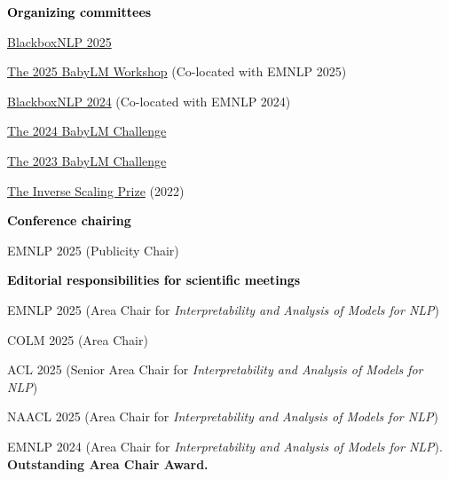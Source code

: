 \documentclass[10pt]{article}
\renewcommand{\subsection}[1]{\textcolor{black}{#1}}
\newcommand{\halfblankline}{\quad\vspace{-0.5\baselineskip}\pagebreak[3]}
\providecommand*\titlelink[2]{\href{#1}{\textcolor{accent}{#2}}}
\begin{document}
	\subsection{\textbf{Organizing committees}}
	\begin{innerlist}[itemsep=0pt]
	\item \titlelink{https://blackboxnlp.github.io}{BlackboxNLP 2025}
	\item \titlelink{https://babylm.github.io}{The 2025 BabyLM Workshop} (Co-located with EMNLP 2025)
	\item \titlelink{https://blackboxnlp.github.io}{BlackboxNLP 2024} (Co-located with EMNLP 2024)
	\item \titlelink{https://babylm.github.io}{The 2024 BabyLM Challenge}
	\item \titlelink{https://babylm.github.io/archive_2023.html}{The 2023 BabyLM Challenge}
	\item \titlelink{https://github.com/inverse-scaling/prize}{The Inverse Scaling Prize} (2022)
	\end{innerlist}

	\halfblankline

	\subsection{\textbf{Conference chairing}}
	\begin{innerlist}[itemsep=0pt]
	\item EMNLP 2025 (Publicity Chair)
	\end{innerlist}

	\halfblankline

	\subsection{\textbf{Editorial responsibilities for scientific meetings}}
	\begin{innerlist}[itemsep=0pt]
	
	\item EMNLP 2025 (Area Chair for \emph{Interpretability and Analysis of Models for NLP})
	\item COLM 2025 (Area Chair)
	\item ACL 2025 (Senior Area Chair for \emph{Interpretability and Analysis of Models for NLP})
	\item NAACL 2025 (Area Chair for \emph{Interpretability and Analysis of Models for NLP})
	\item EMNLP 2024 (Area Chair for \emph{Interpretability and Analysis of Models for NLP}). \textbf{\textcolor{accent}{Outstanding Area Chair Award.}}
	\end{innerlist}
\end{document}
